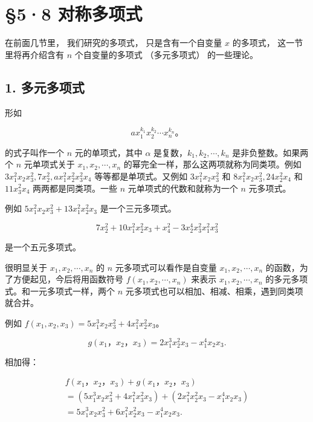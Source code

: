 \section{§5·8 对称多项式}

在前面几节里， 我们研究的多项式， 只是含有一个自变量 \(x\) 的多项式，
这一节里将再介绍含有 \(n\) 个自变量的多项式 （多元多项式） 的一些理论。

\subsection{1. 多元多项式}

形如

\[
a x_1^{k_1}x_2^{k_2}\cdots x_n^{k_n}\text{。}\tag{1}
\]

的式子叫作一个 \(n\) 元的单项式，其中 \(\alpha\)
是复数，\(k_{1}, k_{2}, \cdots, k_{n}\) 是非负整数。如果两个 \(n\)
元单项式关于 \(x_{1}, x_{2}, \cdots, x_{n}\)
的幂完全一样，那么这两项就称为同类项。例如
\(3x_{1}^{2}x_{2}x_{3}^{2}, 7x_{2}^{2}, ax_{1}^{2}x_{2}^{2}x_{3}^{2}x_{4}\)
等等都是单项式。又例如 \(3x_{1}^{2}x_{2}x_{3}^{2}\) 和
\(8x_{1}^{2}x_{2}x_{3}^{2}, 24x_{2}^{2}x_{4}\) 和 \(11x_{3}^{2}x_{4}\)
两两都是同类项。一些 \(n\) 元单项式的代数和就称为一个 \(n\) 元多项式。

例如 \(5x_{1}^{2}x_{2}x_{3}^{2} + 13x_{1}^{2}x_{2}^{2}x_{3}\)
是一个三元多项式。

\[
7 x _ {2} ^ {2} + 10 x _ {1} ^ {2} x _ {2} ^ {2} x _ {3} + x _ {4} ^ {2} - 3 x _ {2} ^ {4} x _ {3} ^ {2} x _ {1} ^ {2} x _ {3} ^ {2}
\]

是一个五元多项式。

很明显关于 \(x_{1}, x_{2}, \cdots, x_{n}\) 的 \(n\)
元多项式可以看作是自变量 \(x_{1}, x_{2}, \cdots, x_{n}\)
的函数，为了方便起见，今后将用函数符号
\(f(x_{1}, x_{2}, \cdots, x_{n})\) 来表示
\(x_{1}, x_{2}, \cdots, x_{n}\) 的多元多项式。和一元多项式一样，两个
\(n\) 元多项式也可以相加、相减、相乘，遇到同类项就合并。

例如
\(f(x_{1}, x_{2}, x_{3}) = 5x_{1}^{3}x_{2}x_{3}^{2} + 4x_{1}^{2}x_{2}^{2}x_{3}\)。

\[
g \left(x _ {1}\text{，} x _ {2}\text{，} x _ {3}\right) = 2 x _ {1} ^ {3} x _ {2} ^ {2} x _ {3} - x _ {1} ^ {4} x _ {2} x _ {3}.
\]

相加得：

\[
\begin{array}{l} f \left(x _ {1}\text{，} x _ {2}\text{，} x _ {3}\right) + g \left(x _ {1}\text{，} x _ {2}\text{，} x _ {3}\right) \\ = \left(5 x _ {1} ^ {3} x _ {2} x _ {3} ^ {2} + 4 x _ {1} ^ {2} x _ {3} ^ {2} x _ {3}\right) + \left(2 x _ {1} ^ {2} x _ {2} ^ {2} x _ {3} - x _ {1} ^ {4} x _ {2} x _ {3}\right) \\ = 5 x _ {1} ^ {3} x _ {2} x _ {3} ^ {2} + 6 x _ {1} ^ {2} x _ {2} ^ {2} x _ {3} - x _ {1} ^ {4} x_ {2} x _ {3}. \\ \end{array}
\]

